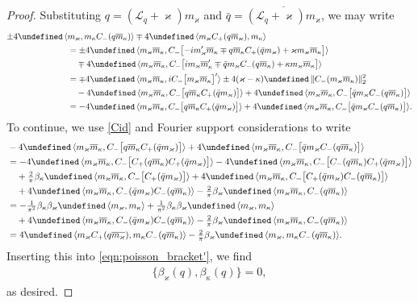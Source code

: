 \documentclass{amsart}
\numberwithin{equation}{section}
\theoremstyle{definition}
\newcommand{\ka}{\kappa}
\newcommand{\vk}{\varkappa}
\newcommand{\Lc}{\mathcal{L}}
\newcommand{\lan}{\langle}
\newcommand{\ran}{\rangle}
\let\Im=\undefined\DeclareMathOperator{\Im}{Im}
\begin{document}
\begin{proof}
Substituting $q=(\Lc_q+\vk) m_\vk$ and $\bar q =\overline{(\Lc_q+\vk) m_\vk} $, we may write
\begin{align*}
\pm4\Im\,\lan &m_\vk, m_\ka C_-(q\overline m_\ka)\ran \mp4\Im\,\lan m_\vk C_+(q\overline m_\vk),m_\ka\ran \\
&=\pm4\Im\,\lan  m_\vk \overline m_\ka,  C_-\bigl[-i m_\vk '\overline m_\ka\mp q\overline m_\ka C_+(\bar{q} m_\vk )+\vk m_\vk \overline m_\ka\bigr]\ran \\
&\quad\mp4\Im\,\lan  m_\vk \overline m_\ka, C_-\bigl[i m_\vk \overline m_\ka '\mp \bar{q}m_\vk C_-(q \overline m_\ka )+\ka m_\vk \overline m_\ka\bigr]\ran\\
&= \mp4\Im\,  \lan  m_\vk \overline m_\ka,  i C_-\bigl[m_\vk \overline m_\ka\bigr]'\ran \pm4 (\vk-\ka)\Im\, \|C_-( m_\vk \overline m_\ka)\|_2^2\\
&\quad -4\Im\,\lan  m_\vk \overline m_\ka,  C_-\bigl[q\overline m_\ka C_+(\bar{q} m_\vk )\bigr]\ran+4 \Im\,\lan  m_\vk \overline m_\ka, C_-\bigl[\bar{q}m_\vk C_-(q \overline m_\ka )\bigr]\ran\\
&=-4\Im\,\lan  m_\vk \overline m_\ka,  C_-\bigl[q\overline m_\ka C_+(\bar{q} m_\vk )\bigr]\ran+4 \Im\,\lan  m_\vk \overline m_\ka, C_-\bigl[\bar{q}m_\vk C_-(q \overline m_\ka )\bigr]\ran.
\end{align*}
To continue, we use \eqref{Cid} and Fourier support considerations to write
\begin{align*}
&-4\Im\,\lan  m_\vk \overline m_\ka,  C_-\bigl[q\overline m_\ka C_+(\bar{q} m_\vk )\bigr]\ran+4 \Im\,\lan  m_\vk \overline m_\ka, C_-\bigl[\bar{q}m_\vk C_-(q \overline m_\ka )\bigr]\ran\\
&=-4\Im\,\lan  m_\vk \overline m_\ka, C_-\bigl[C_+(q\overline m_\ka )C_+(\bar{q} m_\vk )\bigr]\ran -4\Im\,\lan  m_\vk \overline m_\ka ,  C_-\bigl[C_-(q\overline m_\ka )C_+(\bar{q} m_\vk )\bigr]\ran\\
&\quad +\tfrac2{\pi}\beta_\ka \Im\,\lan  m_\vk \overline m_\ka ,  C_-\bigl[C_+(\bar{q} m_\vk )\bigr]\ran+4 \Im\,\lan  m_\vk \overline m_\ka , C_-\bigl[C_+(\bar{q}m_\vk) C_-(q \overline m_\ka  )\bigr]\ran\\
&\quad+4 \Im\,\lan  m_\vk \overline m_\ka , C_-(\bar{q}m_\vk) C_-(q \overline m_\ka  )\ran-\tfrac{2}{\pi} \beta_\vk\Im\,\lan  m_\vk \overline m_\ka , C_-(q \overline m_\ka  )\ran\\
&=- \tfrac1{\pi^2}\beta_\ka\beta_\vk\Im\,\lan  m_\vk,m_\ka\ran+\tfrac1{\pi^2}\beta_\ka\beta_\vk\Im\,\lan  m_\vk,m_\ka\ran \\
&\quad+4 \Im\,\lan  m_\vk \overline m_\ka , C_-(\bar{q}m_\vk) C_-(q \overline m_\ka  )\ran-\tfrac{2}{\pi} \beta_\vk\Im\,\lan  m_\vk \overline m_\ka , C_-(q \overline m_\ka  )\ran\\
&=4\Im\,\lan m_\vk C_+(q\overline{m_\vk}),m_\ka C_-(q\overline m_\ka )\ran -\tfrac{2}{\pi}\beta_\vk\Im\,\lan m_\vk,m_\ka C_-(q\overline{m}_\ka)\ran.
\end{align*}
Inserting this into \eqref{eqn:poisson_bracket'}, we find
\begin{align*}
\{\beta_\vk(q),\beta_\ka(q)\}=0,
\end{align*}
as desired.
\end{proof}
\end{document}
